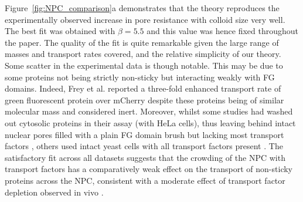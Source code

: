 \documentclass[12pt, a4paper]{article}
\begin{document}
Figure~\ref{fig:NPC_comparison}a demonstrates that the theory reproduces the experimentally observed increase in pore resistance with colloid size very well.
The best fit was obtained with $\beta = 5.5$ and this value was hence fixed  throughout the paper.
The quality of the fit is quite remarkable given the large range of masses and transport rates covered, and the relative simplicity of our theory.
Some scatter in the experimental data is though notable.
This may be due to some proteins not being strictly non-sticky but interacting weakly with FG domains.
Indeed, Frey et al. \cite{Frey2018} reported a three-fold enhanced transport rate of green fluorescent protein over mCherry despite these proteins being of similar molecular mass and considered inert.
Moreover, whilst some studies had washed out cytosolic proteins in their assay (with HeLa cells), thus leaving behind intact nuclear pores filled with a plain FG domain brush but lacking most transport factors \cite{Ribbeck2001, Mohr2009, Frey2018}, others used intact yeast cells with all transport factors present \cite{Popken2015, Timney2016}.
The satisfactory fit across all datasets suggests that the crowding of the NPC with transport factors has a comparatively weak effect on the transport of non-sticky proteins across the NPC, consistent with a moderate effect of transport factor depletion observed in vivo \cite{Kalita2022}.  
\end{document}
